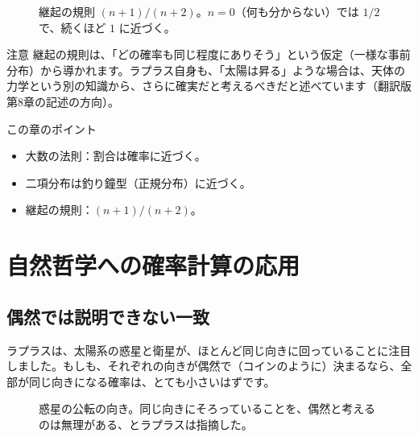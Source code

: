\documentclass[a4paper,11pt,openany]{ltjsbook}
\begin{document}
\begin{figure}[htbp]
\centering
{}
\caption{継起の規則 $(n+1)/(n+2)$。$n=0$（何も分からない）では $1/2$ で、続くほど $1$ に近づく。}
\end{figure}

\begin{notebox}{注意}
継起の規則は、「どの確率も同じ程度にありそう」という仮定（一様な事前分布）から導かれます。ラプラス自身も、「太陽は昇る」ような場合は、天体の力学という別の知識から、さらに確実だと考えるべきだと述べています（翻訳版第8章の記述の方向）。
\end{notebox}

\begin{pointbox}{この章のポイント}
\begin{itemize}[leftmargin=1.5em]
\item 大数の法則：割合は確率に近づく。
\item 二項分布は釣り鐘型（正規分布）に近づく。
\item 継起の規則：$(n+1)/(n+2)$。
\end{itemize}
\end{pointbox}

\chapter{自然哲学への確率計算の応用}

\section{偶然では説明できない一致}

ラプラスは、太陽系の惑星と衛星が、ほとんど同じ向きに回っていることに注目しました。もしも、それぞれの向きが偶然で（コインのように）決まるなら、全部が同じ向きになる確率は、とても小さいはずです。

\begin{figure}[htbp]
\centering
{}
\caption{惑星の公転の向き。同じ向きにそろっていることを、偶然と考えるのは無理がある、とラプラスは指摘した。}
\end{figure}
\end{document}
